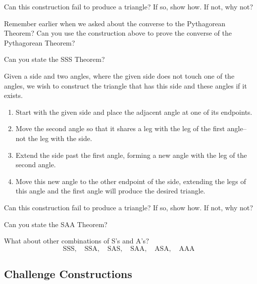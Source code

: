 \begin{ques} 
Can this construction fail to produce a triangle? If so, show how. If
not, why not?
\end{ques}
\QM

\begin{ques}
Remember earlier when we asked about the converse to the Pythagorean
Theorem? Can you use the construction above
to prove the converse of the Pythagorean Theorem?
\end{ques}
\QM

\begin{ques}
Can you state the SSS Theorem?
\end{ques}
\QM


\begin{con} 
Given a side and two angles, where the given side does not touch one
of the angles, we wish to construct the triangle that has this side
and these angles if it exists.
\begin{enumerate}
\item Start with the given side and place the adjacent angle at one of
  its endpoints.
\item Move the second angle so that it shares a leg with the leg of
  the first angle--not the leg with the side.
\item Extend the side past the first angle, forming a new angle with
  the leg of the second angle.
\item Move this new angle to the other endpoint of the side, extending
  the legs of this angle and the first angle will produce the desired
  triangle.
\end{enumerate}
\end{con}


\begin{ques} 
Can this construction fail to produce a triangle? If so, show how. If
not, why not?
\end{ques}
\QM

\begin{ques}
Can you state the SAA Theorem?
\end{ques}
\QM

\begin{ques} What about other combinations of S's and A's?
\[
\text{SSS},\quad \text{SSA},\quad \text{SAS},\quad \text{SAA},\quad \text{ASA},\quad \text{AAA} 
\]
\end{ques}
\QM

\subsection{Challenge Constructions}

